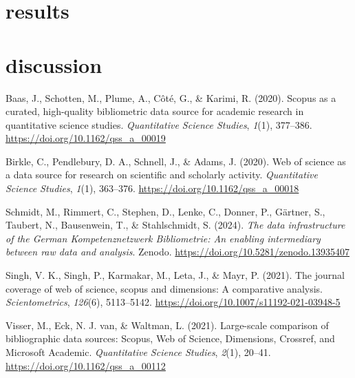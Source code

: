 \documentclass[a4paper,man,floatsintext,longtable,noextraspace,12pt]{apa6}
\newlength{\cslhangindent}
\newenvironment{CSLReferences}[2] %
  {\begin{list}{}{%
   \setlength{\itemindent}{0pt}
   \setlength{\leftmargin}{0pt}
   \setlength{\parsep}{0pt}
   \ifodd #1
    \setlength{\leftmargin}{\cslhangindent}
    \setlength{\itemindent}{-1\cslhangindent}
   \fi
   \setlength{\itemsep}{#2\baselineskip}}}
  {\end{list}}
\begin{document}
\section{results}\label{results}

\section*{discussion}\label{discussion}

\label{refs}
\begin{CSLReferences}{1}{0}
Baas, J., Schotten, M., Plume, A., Côté, G., \& Karimi, R. (2020).
Scopus as a curated, high-quality bibliometric data source for academic
research in quantitative science studies. \emph{Quantitative Science
Studies}, \emph{1}(1), 377--386.
\url{https://doi.org/10.1162/qss_a_00019}

Birkle, C., Pendlebury, D. A., Schnell, J., \& Adams, J. (2020). Web of
science as a data source for research on scientific and scholarly
activity. \emph{Quantitative Science Studies}, \emph{1}(1), 363--376.
\url{https://doi.org/10.1162/qss_a_00018}

Schmidt, M., Rimmert, C., Stephen, D., Lenke, C., Donner, P., Gärtner,
S., Taubert, N., Bausenwein, T., \& Stahlschmidt, S. (2024). \emph{The
data infrastructure of the {German Kompetenznetzwerk Bibliometrie}: An
enabling intermediary between raw data and analysis}. Zenodo.
\url{https://doi.org/10.5281/zenodo.13935407}

Singh, V. K., Singh, P., Karmakar, M., Leta, J., \& Mayr, P. (2021). The
journal coverage of web of science, scopus and dimensions: A comparative
analysis. \emph{Scientometrics}, \emph{126}(6), 5113--5142.
\url{https://doi.org/10.1007/s11192-021-03948-5}

Visser, M., Eck, N. J. van, \& Waltman, L. (2021). Large-scale
comparison of bibliographic data sources: {Scopus, Web of Science,
Dimensions, Crossref, and Microsoft Academic}. \emph{Quantitative
Science Studies}, \emph{2}(1), 20--41.
\url{https://doi.org/10.1162/qss_a_00112}

\end{CSLReferences}
\end{document}
